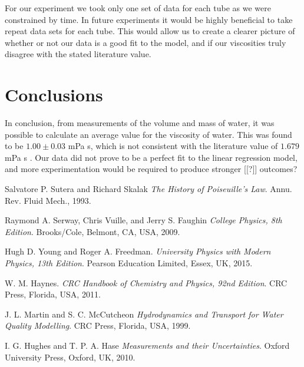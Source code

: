 \documentclass[twocolumn]{revtex4}
\newcommand{\squeezeup}{\vspace{-2.5mm}}
\begin{document}
For our experiment we took only one set of data for each tube as we were constrained by time. In future experiments it would be highly beneficial to take repeat data sets for each tube. This would allow us to create a clearer picture of whether or not our data is a good fit to the model, and if our viscosities truly disagree with the stated literature value. 

\vspace{-5ex}
\section{Conclusions}
\vspace{-2ex}
 
In conclusion, from measurements of the volume and mass of water, it was possible to calculate an average value for the viscosity of water. This was found to be $1.00 \pm 0.03$ mPa s, which is not consistent with the literature value of $1.679$  mPa {s} \cite{crc}. Our data did not prove to be a perfect fit to the linear regression model, and more experimentation would be required to produce stronger [[?]] outcomes?
\squeezeup
\squeezeup

\begin{thebibliography}{5}
	Salvatore P. Sutera and Richard Skalak
	\textit{The History of Poiseuille's Law}.
	Annu. Rev. Fluid Mech., 1993.
	
	Raymond A. Serway, Chris Vuille, and Jerry S. Faughin
	\textit{College Physics, 8th Edition}.
	Brooks/Cole, Belmont, CA, USA, 2009.

	Hugh D. Young and Roger A. Freedman.
	\textit{University Physics with Modern Physics, 13th Edition}. 
	Pearson Education Limited, Essex, UK, 2015.
	
	W. M. Haynes.
	\textit{CRC Handbook of Chemistry and Physics, 92nd Edition}. 
	CRC Press, Florida, USA, 2011.
	
	J. L. Martin and S. C. McCutcheon
	\textit{Hydrodynamics and Transport for Water Quality Modelling}. 
	CRC Press, Florida, USA, 1999.
	
	I. G. Hughes and T. P. A. Hase
	\textit{Measurements and their Uncertainties}. 
	Oxford University Press, Oxford, UK, 2010.
	
\end{thebibliography}
\clearpage

\vfill
\twocolumngrid
\vspace{-3ex}
\end{document}
